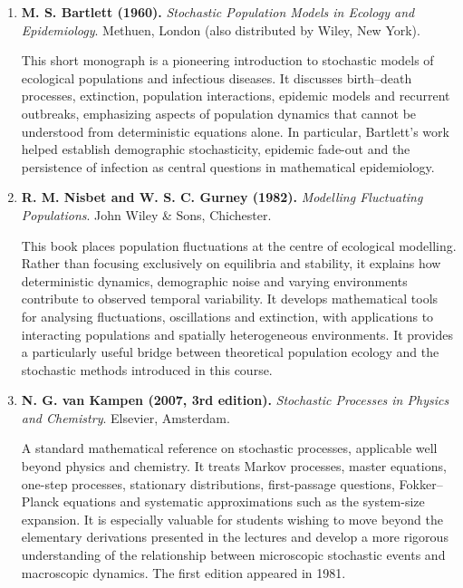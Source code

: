 \begin{enumerate}
\item \textbf{M. S. Bartlett (1960).} \emph{Stochastic Population Models in Ecology and Epidemiology}. Methuen, London (also distributed by Wiley, New York). \citep{Bartlett1960StochasticPopulation}

This short monograph is a pioneering introduction to stochastic models of ecological populations and infectious diseases. It discusses birth--death processes, extinction, population interactions, epidemic models and recurrent outbreaks, emphasizing aspects of population dynamics that cannot be understood from deterministic equations alone. In particular, Bartlett's work helped establish demographic stochasticity, epidemic fade-out and the persistence of infection as central questions in mathematical epidemiology.

\item \textbf{R. M. Nisbet and W. S. C. Gurney (1982).} \emph{Modelling Fluctuating Populations}. John Wiley \& Sons, Chichester. \citep{Nisbet82}

This book places population fluctuations at the centre of ecological modelling. Rather than focusing exclusively on equilibria and stability, it explains how deterministic dynamics, demographic noise and varying environments contribute to observed temporal variability. It develops mathematical tools for analysing fluctuations, oscillations and extinction, with applications to interacting populations and spatially heterogeneous environments. It provides a particularly useful bridge between theoretical population ecology and the stochastic methods introduced in this course.

\item \textbf{N. G. van Kampen (2007, 3rd edition).} \emph{Stochastic Processes in Physics and Chemistry}. Elsevier, Amsterdam. \citep{vanKampen2007Stochastic}

A standard mathematical reference on stochastic processes, applicable well beyond physics and chemistry. It treats Markov processes, master equations, one-step processes, stationary distributions, first-passage questions, Fokker--Planck equations and systematic approximations such as the system-size expansion. It is especially valuable for students wishing to move beyond the elementary derivations presented in the lectures and develop a more rigorous understanding of the relationship between microscopic stochastic events and macroscopic dynamics. The first edition appeared in 1981.


\end{enumerate}
